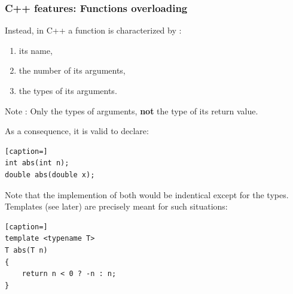 \documentclass[8pt]{beamer}
\begin{document}
\begin{frame}[containsverbatim]
\frametitle{C++ features: Functions overloading}
Instead, in C++ a function is characterized by : 
\begin{enumerate}
 \item its name,
 \item the number of its arguments,
 \item the types of its arguments.
\end{enumerate}
Note : Only the types of arguments, {\bf not} the type of its return value.

\medskip

As a consequence, it is valid to declare:

\begin{lstlisting}[caption=]
int abs(int n);
double abs(double x);
\end{lstlisting}

Note that the implemention of both would be indentical except for the types.
Templates (see later) are precisely meant for such situations:

\begin{lstlisting}[caption=]
template <typename T>
T abs(T n)
{
	return n < 0 ? -n : n;
}
\end{lstlisting}
\end{frame}
\end{document}
